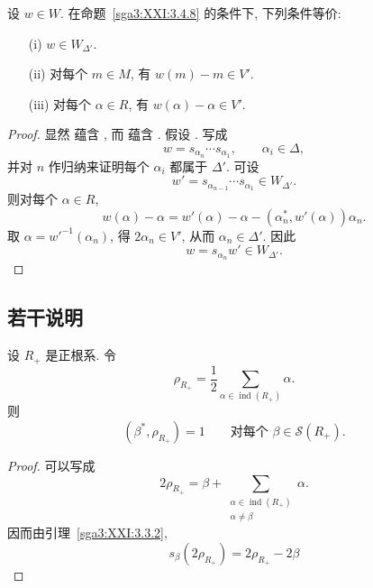 \begin{lemma}\label{sga3:XXI:3.4.10}
设 \(w\in W\). 在命题~\ref{sga3:XXI:3.4.8} 的条件下, 下列条件等价:
\begin{enumerate}
\item[\SGAInlineRefTarget{sga3:XXI:3.4.10:item:i}(i)] \(w\in W_{\Delta'}\).
\item[\SGAInlineRefTarget{sga3:XXI:3.4.10:item:ii}(ii)] 对每个 \(m\in M\), 有 \(w(m)-m\in V'\).
\item[(iii)] 对每个 \(\alpha\in R\), 有 \(w(\alpha)-\alpha\in V'\).
\end{enumerate}
\end{lemma}
\begin{proof}
显然  蕴含 , 而  蕴含 . 假设 . 写成
\[
 w=s_{\alpha_n}\cdots s_{\alpha_1},
 \qquad \alpha_i\in\Delta,
\]
并对 \(n\) 作归纳来证明每个 \(\alpha_i\) 都属于 \(\Delta'\). 可设
\[
 w'=s_{\alpha_{n-1}}\cdots s_{\alpha_1}\in W_{\Delta'}.
\]
则对每个 \(\alpha\in R\),
\[
 w(\alpha)-\alpha
   =w'(\alpha)-\alpha-(\alpha_n^\ast,w'(\alpha))\alpha_n.
\]
取 \(\alpha=w'^{-1}(\alpha_n)\), 得 \(2\alpha_n\in V'\), 从而 \(\alpha_n\in\Delta'\). 因此
\[
 w=s_{\alpha_n}w'\in W_{\Delta'}.
\]
\end{proof}

\subsection{若干说明}
\label{sga3:XXI:3.5}
\begin{proposition}\label{sga3:XXI:3.5.1}
设 \(R_+\) 是正根系. 令
\[
 \rho_{R_+}
   =\frac12\sum_{\alpha\in\operatorname{ind}(R_+)}\alpha.
\]
则
\[
 (\beta^\ast,\rho_{R_+})=1
 \qquad\text{对每个 }\beta\in\mathscr{S}(R_+).
\]
\end{proposition}
\begin{proof}
可以写成
\[
 2\rho_{R_+}
   =\beta+
     \sum_{\substack{\alpha\in\operatorname{ind}(R_+)\\
                     \alpha\ne\beta}}\alpha.
\]
因而由引理~\ref{sga3:XXI:3.3.2},
\[
 s_\beta(2\rho_{R_+})=2\rho_{R_+}-2\beta
\]
\end{proof}


